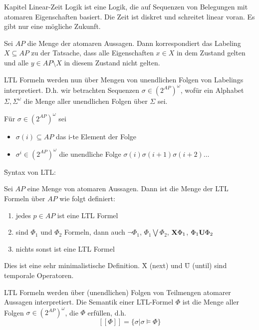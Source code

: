 \begin{chapter}{Kapitel}
\noindent Linear-Zeit Logik ist eine Logik, die auf Sequenzen von Belegungen mit atomaren Eigenschaften basiert. Die Zeit ist diskret und schreitet linear voran. Es gibt 
nur eine mögliche Zukunft.
\vspace*{4pt}

\noindent Sei $AP$ die Menge der atomaren Aussagen. Dann korrespondiert das Labeling $X \subseteq AP$ zu der Tatsache, dass alle Eigenschaften $x\in X$ in dem 
Zustand gelten und alle $y\in AP\setminus X$ in diesem Zustand nicht gelten.

\noindent LTL Formeln werden nun über Mengen von unendlichen Folgen von Labelings interpretiert. D.h. wir betrachten Sequenzen $\sigma \in (2^{AP})^\omega$, wofür
ein Alphabet $\Sigma, \Sigma^\omega$ die Menge aller unendlichen Folgen über $\Sigma$ sei. 

\noindent Für $\sigma \in (2^{AP})^\omega$ sei 
\begin{itemize}
 \item $\sigma(i) \subseteq AP$ das i-te Element der Folge
 \item $\sigma^i \in (2^{AP})^\omega$ die unendliche Folge $\sigma(i)\sigma(i+1)\sigma(i+2)\dots$
\end{itemize}
\vspace*{5pt}

\f{Syntax von LTL}:
\vspace*{4pt}

\noindent Sei $AP$ eine Menge von atomaren Aussagen. Dann ist die Menge der LTL Formeln über $AP$ wie folgt definiert: 
\begin{enumerate}
 \item jedes $p\in AP$ ist eine LTL Formel 
 \item sind $\Phi_1$ und $\Phi_2$ Formeln, dann auch $\neg \Phi_1$, $\Phi_1 \bigvee \Phi_2$, $\f{X}\Phi_1$, $\Phi_1\f{U}\Phi_2$
 \item nichts sonst ist eine LTL Formel 
\end{enumerate}

\noindent Dies ist eine sehr minimalistische Definition. \f{X} (next) und \f{U} (until) sind temporale Operatoren. 
\vspace*{4pt}

\noindent LTL Formeln werden über (unendlichen) Folgen von Teilmengen atomarer Aussagen interpretiert. Die Semantik einer LTL-Formel $\Phi$ ist die Menge aller 
Folgen $\sigma \in (2^{AP})^\omega$, die $\Phi$ erfüllen, d.h. 
\[[[\Phi]] = \{\sigma | \sigma \vDash \Phi\}\]


\end{chapter}

